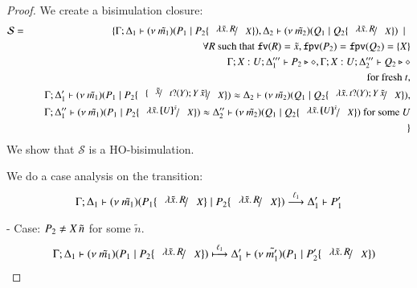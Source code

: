 \begin{proof}
	We create a bisimulation closure:
%
	\begin{eqnarray*}
		\mathcal{S} &=&
			\set{\horel{\Gamma}{\Delta_1}{\newsp{\tilde{m_1}}{P_1 \Par P_2 \subst{\abs{\tilde{x}}{R}}{X}}}{,}
			{\Delta_2}{\newsp{\tilde{m_2}}{Q_1 \Par Q_2 \subst{\abs{\tilde{x}}{R}}{X}}} \setbar \\
			&& \quad \forall R \textrm{ such that } \fv{R} = \tilde{x}, \fpv{P_2} = \fpv{Q_2} = \set{X}\\
			&& \quad \Gamma; X: U; \Delta_1''' \proves P_2 \hastype \Proc, \Gamma; X: U; \Delta_2''' \proves Q_2 \hastype \Proc\\
			&& \quad \textrm{for fresh } t,\\
			&& \quad \horel{\Gamma}{\Delta_1'}{\newsp{\tilde{m_1}}{P_1 \Par P_2 \subst{\subst{\tilde{x}}{\binp{t}{Y} \appl{Y}{\tilde{x}}}}{X}}}{\wb}{\Delta_2}{\newsp{\tilde{m_2}}{Q_1 \Par Q_2 \subst{\abs{\tilde{x}}{\binp{t}{Y} \appl{Y}{\tilde{x}}}}{X}}},\\
			&& \quad \horel{\Gamma}{\Delta_1''}{\newsp{\tilde{m_1}}{P_1 \Par P_2 \subst{\abs{\tilde{x}}{\mapchar{U}{\tilde{x}}}}{X}}}{\wb}{\Delta_2''}{\newsp{\tilde{m_2}}{Q_1 \Par Q_2 \subst{\abs{\tilde{x}}{\mapchar{U}{\tilde{x}}}}{X}} \textrm{ for some } U}\\
			&&}
	\end{eqnarray*}
%
	\noi  We show that $\mathcal{S}$ is a HO-bisimulation.

	\noi We do a case analysis on the transition:
%
	\[
		\horel{\Gamma}{\Delta_1}{\newsp{\tilde{m_1}}{P_1 \subst{\abs{\tilde{x}}{R}}{X} \Par P_2\subst{\abs{\tilde{x}}{R}}{X} }}{\by{\ell_1}}{\Delta_1'}{P_1'}
	\]
%

	\noi - Case: $P_2 \not= X\,\tilde{n}$ for some $\tilde{n}$.
%
	\begin{eqnarray*}
		&&	\horel{\Gamma}{\Delta_1}
			{\newsp{\tilde{m_1}}{P_1 \Par P_2 \subst{\abs{\tilde{x}}{R}}{X} }}
			{\hby{\ell_1}}
			{\Delta_1'}{\newsp{\tilde{m_1'}}{P_1 \Par P_2' \subst{\abs{\tilde{x}}{R}}{X}}}
	\end{eqnarray*}


\end{proof}
